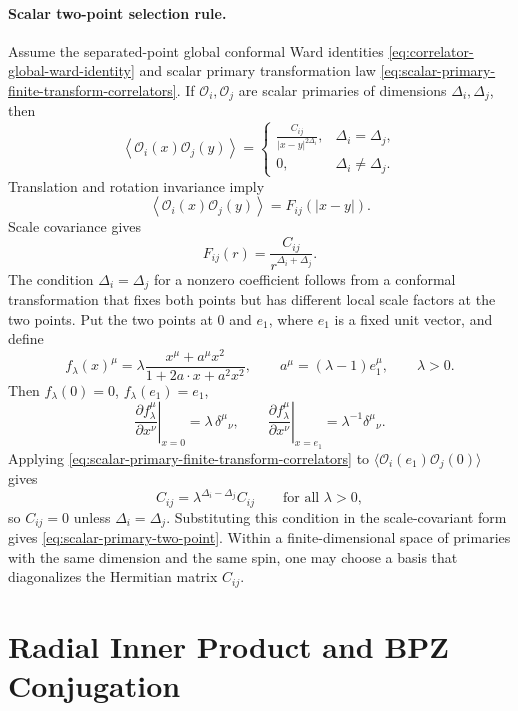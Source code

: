 \paragraph{Scalar two-point selection rule.}
Assume the separated-point global conformal Ward identities
\eqref{eq:correlator-global-ward-identity} and scalar primary transformation
law \eqref{eq:scalar-primary-finite-transform-correlators}.  If
\(\mathcal O_i,\mathcal O_j\) are scalar primaries of dimensions
\(\Delta_i,\Delta_j\), then
\begin{equation}
  \left\langle \mathcal O_i(x)\mathcal O_j(y)\right\rangle
  =
  \begin{cases}
    \displaystyle \frac{C_{ij}}{|x-y|^{2\Delta_i}},
    &\Delta_i=\Delta_j,\\[1.0em]
    0,&\Delta_i\ne\Delta_j .
  \end{cases}
  \label{eq:scalar-primary-two-point}
\end{equation}
Translation and rotation invariance imply
\[
  \left\langle \mathcal O_i(x)\mathcal O_j(y)\right\rangle
  =
  F_{ij}(|x-y|).
\]
Scale covariance gives
\[
  F_{ij}(r)=\frac{C_{ij}}{r^{\Delta_i+\Delta_j}}.
\]
The condition \(\Delta_i=\Delta_j\) for a nonzero coefficient follows from a
conformal transformation that fixes both points but has different local scale
factors at the two points.  Put the two points at \(0\) and \(e_1\), where
\(e_1\) is a fixed unit vector, and define
\[
  f_\lambda(x)^\mu
  =
  \lambda
  \frac{x^\mu+a^\mu x^2}{1+2a\cdot x+a^2x^2},
  \qquad
  a^\mu=(\lambda-1)e_1^\mu,
  \qquad
  \lambda>0 .
\]
Then \(f_\lambda(0)=0\), \(f_\lambda(e_1)=e_1\),
\[
  \left.\frac{\partial f_\lambda^\mu}{\partial x^\nu}\right|_{x=0}
  =
  \lambda\,\delta^\mu{}_\nu,
  \qquad
  \left.\frac{\partial f_\lambda^\mu}{\partial x^\nu}\right|_{x=e_1}
  =
  \lambda^{-1}\delta^\mu{}_\nu .
\]
Applying \eqref{eq:scalar-primary-finite-transform-correlators} to
\(\langle\mathcal O_i(e_1)\mathcal O_j(0)\rangle\) gives
\[
  C_{ij}=\lambda^{\Delta_i-\Delta_j}C_{ij}
  \qquad\text{for all }\lambda>0,
\]
so \(C_{ij}=0\) unless \(\Delta_i=\Delta_j\).  Substituting this condition in
the scale-covariant form gives \eqref{eq:scalar-primary-two-point}.
Within a finite-dimensional space of primaries with the same dimension and the
same spin, one may choose a basis that diagonalizes the Hermitian matrix
\(C_{ij}\).

\section{Radial Inner Product and BPZ Conjugation}

